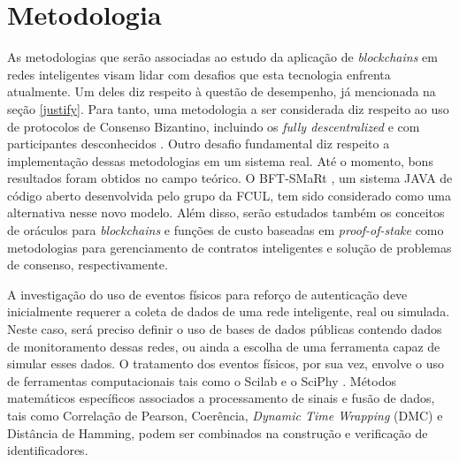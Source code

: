 \documentclass[12pt]{article}
\begin{document}
\section {Metodologia}
As metodologias que serão associadas ao estudo da aplicação de \textit{blockchains} em redes inteligentes visam lidar com desafios que esta tecnologia enfrenta atualmente. Um deles diz respeito à questão de desempenho, já mencionada na seção \ref{justify}. Para tanto, uma metodologia a ser considerada diz respeito ao uso de protocolos de Consenso Bizantino, incluindo os \textit{fully descentralized}\cite{moniz2011ritas} e com participantes desconhecidos \cite{alchieri2016knowledge}. Outro desafio fundamental diz respeito a implementação dessas metodologias em um sistema real. Até o momento, bons resultados foram obtidos no campo teórico. O BFT-SMaRt \cite{bessani2014state}, um sistema JAVA de código aberto desenvolvida pelo grupo da FCUL, tem sido considerado como uma alternativa nesse novo modelo. Além disso, serão estudados também os conceitos de oráculos para \textit{blockchains} e funções de custo baseadas em \textit{proof-of-stake} como metodologias para gerenciamento de contratos inteligentes e solução de problemas de consenso, respectivamente.


A investigação do uso de eventos físicos para reforço de autenticação deve inicialmente requerer a coleta de dados de uma rede inteligente, real ou simulada. Neste caso, será preciso definir o uso de bases de dados públicas contendo dados de monitoramento dessas redes, ou ainda a escolha de uma ferramenta capaz de simular esses dados. O tratamento dos eventos físicos, por sua vez, envolve o uso de ferramentas computacionais tais como o Scilab \cite{Scilab2012} e o SciPhy \cite{SciPy2017}. Métodos matemáticos específicos associados a processamento de sinais e fusão de dados, tais como Correlação de Pearson, Coerência, \textit{Dynamic Time Wrapping} (DMC) e Distância de Hamming, podem ser combinados na construção e verificação de identificadores.
\end{document}

